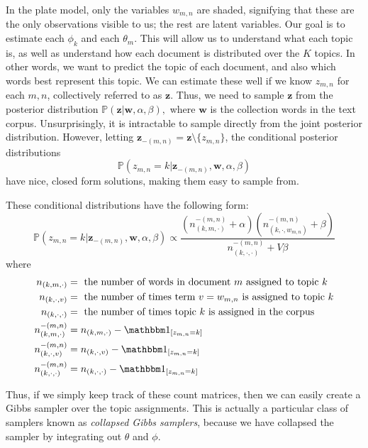 In the plate model, only the variables $w_{m,n}$ are shaded, signifying that these are the only observations visible to us; the rest are latent variables. Our goal is to estimate each $\phi_{k}$ and each $\theta_{m}$. This will allow us to understand what each topic is, as well as understand how each document is distributed over the $K$ topics. In other words, we want to predict the topic of each document, and also which words best represent this topic.  We can estimate these well if we know $z_{m,n}$ for each $m, n$, collectively referred to as $\mathbf{z}$. Thus, we need to sample
$\mathbf{z}$ from the posterior distribution $\mathbb{P}(\mathbf{z} | \mathbf{w}, \alpha, \beta),$ where $\mathbf{w}$ is the collection words in the text corpus. Unsurprisingly, it is intractable to sample directly from the joint posterior distribution. However, letting $\mathbf{z}_{-(m,n)} = \mathbf{z}\setminus \{z_{m,n}\}$, the conditional posterior distributions
\[\mathbb{P}(z_{m,n} = k | \mathbf{z}_{-(m,n)}, \mathbf{w}, \alpha, \beta)\]
have nice, closed form solutions, making them easy to sample from.

These conditional distributions have the following form:
\begin{equation*}
\mathbb{P}(z_{m,n} = k | \mathbf{z}_{-(m,n)}, \mathbf{w}, \alpha, \beta) \propto \frac{(n_{(k,m,\cdot)}^{-(m,n)} + \alpha)(n_{(k, \cdot, w_{m,n})}^{-(m,n)} + \beta)}{n_{(k,\cdot,\cdot)}^{-(m,n)} + V \beta}
\end{equation*}
where
\begin{align*}
n_{(k,m,\cdot)} & = \mbox{ the number of words in document $m$ assigned to topic $k$} \\
n_{(k,\cdot,v)} & = \mbox{ the number of times term $v = w_{m,n}$ is assigned to topic $k$} \\
n_{(k,\cdot,\cdot)} & = \mbox{ the number of times topic $k$ is assigned in the corpus} \\
n_{(k,m,\cdot)}^{-(m,n)} & = n_{(k,m,\cdot)} - \indicator{z_{m,n} = k} \\
n_{(k,\cdot,v)}^{-(m,n)} & = n_{(k,\cdot,v)} - \indicator{z_{m,n} = k} \\
n_{(k,\cdot,\cdot)}^{-(m,n)} & = n_{(k,\cdot,\cdot)} - \indicator{z_{m,n} = k}
\end{align*}

Thus, if we simply keep track of these count matrices, then we can easily create a Gibbs sampler over the topic assignments. This is actually a particular class of samplers known as \emph{collapsed Gibbs samplers}, because we have collapsed the sampler by integrating out $\theta$ and $\phi$.

